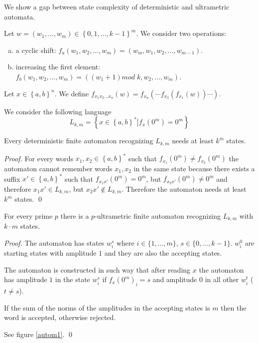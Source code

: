 \documentclass{llncs}
\begin{document}
We show a gap between state complexity of deterministic and ultrametric automata.

Let $w = \left( w_1, \ldots, w_m \right) \in \left\{ 0, 1, \ldots, k-1 \right\} ^ m$.
We consider two operations:
\begin{enumerate}[a)]
  \item a cyclic shift: $f_a \left( w_1, w_2, \ldots, w_{m} \right) = \left( w_{m}, w_1, w_2, \ldots, w_{m-1} \right)$.
  \item increasing the first element: $f_b \left( w_1, w_2, \ldots, w_{m} \right) = \left( \left( w_1 + 1 \right) mod \; k, w_2, \ldots, w_{m} \right)$.
\end{enumerate}


Let $x \in \left\{ a, b \right\} ^n$. We define $f_{x_1 x_2 \ldots x_n} \left( w \right) = f_{x_n} \left( \cdots f_{x_2} \left( f_{x_1} \left( w \right) \right) \cdots \right)$.

We consider the following language
$$
L_{k,m} = \left\{ x \in \left\{ a, b \right\}^* \left| f_x(0^m) = 0^m \right.  \right\}
$$


\begin{theorem}
Every deterministic finite automaton recognizing $L_{k,m}$ needs at least $k^m$ states.
\end{theorem}
\begin{proof}
For every words $x_1, x_2 \in \left\{ a,b \right\}^*$ such that $f_{x_1}(0^m) \not = f_{x_2}(0^m)$ the automaton cannot remember words $x_1, x_2$ in the same state because there exists a suffix $x' \in \left\{ a,b \right\}^*$ such that $f_{x_1 x'}(0^m) = 0^m$, but $f_{x_2 x'}(0^m) \not = 0^m$ and therefore $x_1 x' \in L_{k,m}$, but $x_2 x' \notin L_{k,m}$. Therefore the automaton needs at least $k^m$ states.
\qed
\end{proof}



\begin{theorem}
For every prime $p$ there is a $p$-ultrametric finite automaton recognizing $L_{k,m}$ with $k \cdot m$ states.
\end{theorem}
\begin{proof}
The automaton has states $w_i^s$ where $i \in \{1, \ldots, m\}$, $s \in \{0, \ldots, k-1\}$.
$w_i^0$ are starting states with amplitude $1$ and they are also the accepting states.

The automaton is constructed in such way that after reading $x$ the automaton has amplitude $1$ in the state $w_i^s$ if $f_x(0^m)_i = s$ and amplitude $0$ in all other $w_i^t$ ($t \not = s$).

If the sum of the norms of the amplitudes in the accepting states is $m$ then the word is accepted, otherwise rejected.

See figure \ref{autom1}.
\qed
\end{proof}
\end{document}
